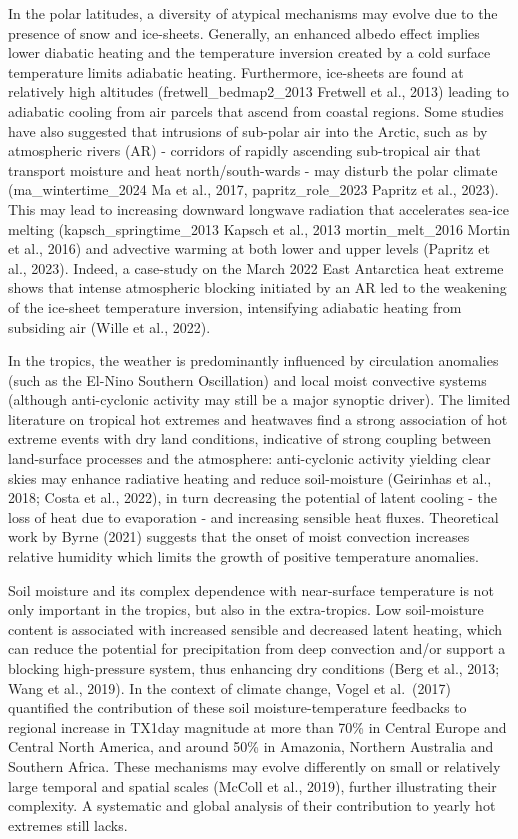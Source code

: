 \documentclass[11pt,a4paper,twoside,openright]{report}
\theoremstyle{definition}
\begin{document}
In the polar latitudes, a diversity of atypical mechanisms may evolve due to the presence of snow and ice-sheets. Generally, an enhanced albedo effect implies lower diabatic heating and the temperature inversion created by a cold surface temperature limits adiabatic heating. Furthermore, ice-sheets are found at relatively high altitudes (fretwell\_bedmap2\_2013 Fretwell et al., 2013) leading to adiabatic cooling from air parcels that ascend from coastal regions. Some studies have also suggested that intrusions of sub-polar air into the Arctic, such as by atmospheric rivers (AR) - corridors of rapidly ascending sub-tropical air that transport moisture and heat north/south-wards - may disturb the polar climate (ma\_wintertime\_2024 Ma et al., 2017, papritz\_role\_2023 Papritz et al., 2023). This may lead to increasing downward longwave radiation that accelerates sea-ice melting (kapsch\_springtime\_2013 Kapsch et al., 2013 mortin\_melt\_2016 Mortin et al., 2016) and advective warming at both lower and upper levels (Papritz et al., 2023). Indeed, a case-study on the March 2022 East Antarctica heat extreme shows that intense atmospheric blocking initiated by an AR led to the weakening of the ice-sheet temperature inversion, intensifying adiabatic heating from subsiding air (Wille et al., 2022).

In the tropics, the weather is predominantly influenced by circulation anomalies (such as the El-Nino Southern Oscillation) and local moist convective systems (although anti-cyclonic activity may still be a major synoptic driver). The limited literature on tropical hot extremes and heatwaves find a strong association of hot extreme events with dry land conditions, indicative of strong coupling between land-surface processes and the atmosphere: anti-cyclonic activity yielding clear skies may enhance radiative heating and reduce soil-moisture (Geirinhas et al., 2018; Costa et al., 2022), in turn decreasing the potential of latent cooling - the loss of heat due to evaporation - and increasing sensible heat fluxes. Theoretical work by Byrne (2021) suggests that the onset of moist convection increases relative humidity which limits the growth of positive temperature anomalies.

Soil moisture and its complex dependence with near-surface temperature is not only important in the tropics, but also in the extra-tropics. Low soil-moisture content is associated with increased sensible and decreased latent heating, which can reduce the potential for precipitation from deep convection and/or support a blocking high-pressure system, thus enhancing dry conditions (Berg et al., 2013; Wang et al., 2019). In the context of climate change, Vogel et al.~(2017) quantified the contribution of these soil moisture-temperature feedbacks to regional increase in TX1day magnitude at more than 70\% in Central Europe and Central North America, and around 50\% in Amazonia, Northern Australia and Southern Africa. These mechanisms may evolve differently on small or relatively large temporal and spatial scales (McColl et al., 2019), further illustrating their complexity. A systematic and global analysis of their contribution to yearly hot extremes still lacks.
\end{document}
